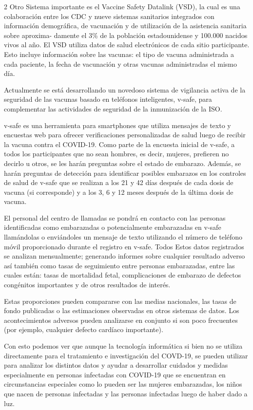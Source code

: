 \documentclass[12pt,spanish,Letterpaper,openany]{book}
\begin{document}
\begin {multicols}{2}
Otro Sistema importante es el Vaccine Safety Datalink (VSD), la cual es una colaboración
entre los CDC y nueve sistemas sanitarios integrados con información demográfica, de
vacunación y de utilización de la asistencia sanitaria sobre aproxima-
damente el 3\% de la
población estadounidense y 100.000 nacidos vivos al año. El VSD utiliza datos de salud
electrónicos de cada sitio participante. Esto incluye información sobre las vacunas: el tipo de
vacuna administrada a cada paciente, la fecha de vacunación y otras vacunas administradas el
mismo día.

Actualmente se está desarrollando un novedoso sistema de vigilancia activa de la seguridad
de las vacunas basado en teléfonos inteligentes, v-safe, para complementar las actividades de
seguridad de la inmunización de la ISO.

v-safe es una herramienta para smartphones que utiliza mensajes de texto y encuestas web
para ofrecer verificaciones personalizadas de salud luego de recibir la vacuna contra el
COVID-19. Como parte de la encuesta inicial de v-safe, a todos los participantes que no sean
hombres, es decir, mujeres, prefieren no decirlo u otros, se les harán preguntas sobre el estado
de embarazo. Además, se harán preguntas de detección para identificar posibles embarazos
en los controles de salud de v-safe que se realizan a los 21 y 42 días después de cada dosis de
vacuna (si corresponde) y a los 3, 6 y 12 meses después de la última dosis de vacuna.

El personal del centro de llamadas se pondrá en contacto con las personas identificadas como
embarazadas o potencialmente embarazadas en v-safe llamándolas o enviándoles un mensaje
de texto utilizando el número de teléfono móvil proporcionado durante el registro en v-safe.
Todos Estos datos registrados se analizan mensualmente; generando informes sobre cualquier
resultado adverso así también como tasas de seguimiento entre personas embarazadas, entre
las cuales están: tasas de mortalidad fetal, complicaciones de embarazo de defectos
congénitos importantes y de otros resultados de interés.

Estas proporciones pueden compararse con las medias nacionales, las tasas de fondo
publicadas o las estimaciones observadas en otros sistemas de datos. Los acontecimientos
adversos pueden analizarse en conjunto si son poco frecuentes (por ejemplo, cualquier
defecto cardíaco importante).

Con esto podemos ver que aunque la tecnología informática si bien no se utiliza directamente
para el tratamiento e investigación del COVD-19, se pueden utilizar para analizar los
distintos datos y ayudar a desarrollar cuidados y medidas especialmente en personas
infectadas con COVID-19 que se encuentran en circunstancias especiales como lo pueden ser
las mujeres embarazadas, los niños que nacen de personas infectadas y las personas
infectadas luego de haber dado a luz.


\end{multicols}
\end{document}
